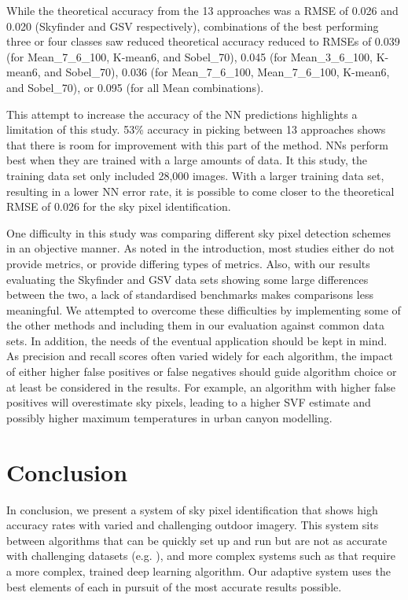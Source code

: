 \documentclass[final,3p,times,authoryear]{elsarticle}
\begin{document}
While the theoretical accuracy from the 13 approaches was a RMSE of 0.026 and 0.020 (Skyfinder and GSV respectively), combinations of the best performing three or four classes saw reduced theoretical accuracy reduced to RMSEs of 0.039 (for Mean\_7\_6\_100, K-mean6, and Sobel\_70), 0.045 (for Mean\_3\_6\_100, K-mean6, and Sobel\_70), 0.036 (for Mean\_7\_6\_100, Mean\_7\_6\_100, K-mean6, and Sobel\_70), or 0.095 (for all Mean combinations). 

This attempt to increase the accuracy of the NN predictions highlights a limitation of this study. 53\% accuracy in picking between 13 approaches shows that there is room for improvement with this part of the method. NNs perform best when they are trained with a large amounts of data. It this study, the training data set only included 28,000 images. With a larger training data set, resulting in a lower NN error rate, it is possible to come closer to the theoretical RMSE of 0.026 for the sky pixel identification.

One difficulty in this study was comparing different sky pixel detection schemes in an objective manner. As noted in the introduction, most studies either do not provide metrics, or provide differing types of metrics. Also, with our results evaluating the Skyfinder and GSV data sets showing some large differences between the two, a lack of standardised benchmarks makes comparisons less meaningful. We attempted to overcome these difficulties by implementing some of the other methods and including them in our evaluation against common data sets. In addition, the needs of the eventual application should be kept in mind. As precision and recall scores often varied widely for each algorithm, the impact of either higher false positives or false negatives should guide algorithm choice or at least be considered in the results. For example, an algorithm with higher false positives will overestimate sky pixels, leading to a higher SVF estimate and possibly higher maximum temperatures in urban canyon modelling. 



\section{Conclusion}\label{sec:conclusion}

In conclusion, we present a system of sky pixel identification that shows high accuracy rates with varied and challenging outdoor imagery. This system sits between algorithms that can be quickly set up and run but are not as accurate with challenging datasets (e.g. \cite{Middel2018}), and more complex systems such as \cite{Gong2018} that require a more complex, trained deep learning algorithm. Our adaptive system uses the best elements of each in pursuit of the most accurate results possible.
\end{document}
